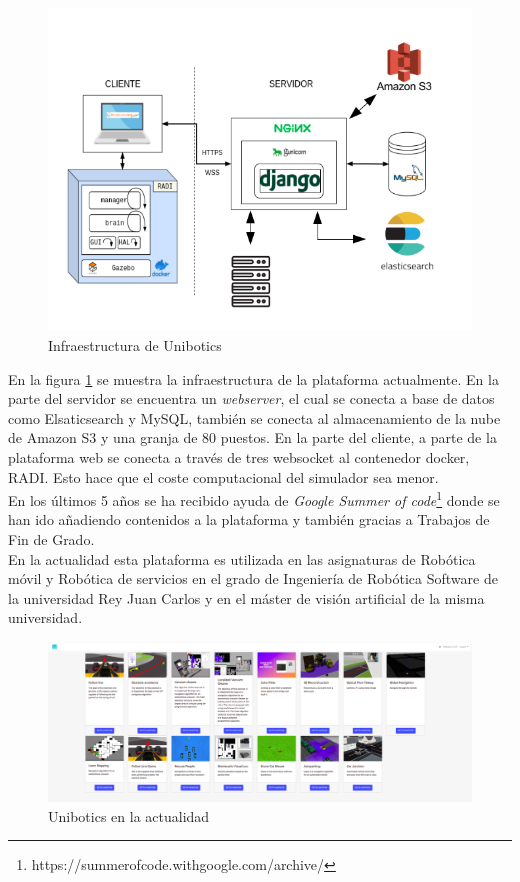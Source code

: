 \begin{figure}[H]
    \centering
    \includegraphics[width=13cm, keepaspectratio]{img/infraestructura.png}
    \caption{Infraestructura de Unibotics}
    \label{fig:infra}
\end{figure}
En la figura \ref{fig:infra} se muestra la infraestructura de la plataforma actualmente. En la parte del servidor se encuentra un \textit{webserver}, el cual se conecta a base de datos como Elsaticsearch y MySQL, también se conecta al almacenamiento de la nube de Amazon S3 y una granja de 80 puestos. En la parte del cliente, a parte de la plataforma web se conecta a través de tres websocket al contenedor docker, RADI. Esto hace que el coste computacional del simulador sea menor.\\

En los últimos 5 años se ha recibido ayuda de \textit{Google Summer of code}\footnote{https://summerofcode.withgoogle.com/archive/} donde se han ido añadiendo contenidos a la plataforma y también gracias a Trabajos de Fin de Grado.\\

En la actualidad esta plataforma es utilizada en las asignaturas de Robótica móvil y Robótica de servicios en el grado de Ingeniería de Robótica Software  de la universidad Rey Juan Carlos y en el máster de visión artificial de la misma universidad.

\begin{figure}[H]
    \centering
    \includegraphics[width=15cm, keepaspectratio]{img/unibotics.png}
    \caption{Unibotics en la actualidad}
    \label{fig:unibotics}
\end{figure}

